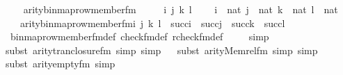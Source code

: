 \begin{isabellebody}
\ \ \isamarkupfalse%
%
\endisatagproof
{\isafoldproof}%
%
\isadelimproof
\isanewline
%
\endisadelimproof
\isanewline
{}\isamarkupfalse%
\ arity{\isacharunderscore}{\kern0pt}binmap{\isacharunderscore}{\kern0pt}row{\isacharprime}{\kern0pt}{\isacharunderscore}{\kern0pt}member{\isacharunderscore}{\kern0pt}fm\ {\isacharcolon}{\kern0pt}\ \isanewline
\ \ \ i\ j\ k\ l\ \isanewline
\ \ \ {\isachardoublequoteopen}i\ {\isasymin}\ nat{\isachardoublequoteclose}\ {\isachardoublequoteopen}j\ {\isasymin}\ nat{\isachardoublequoteclose}\ {\isachardoublequoteopen}k\ {\isasymin}\ nat{\isachardoublequoteclose}\ {\isachardoublequoteopen}l\ {\isasymin}\ nat{\isachardoublequoteclose}\ \isanewline
\ \ \ {\isachardoublequoteopen}arity{\isacharparenleft}{\kern0pt}binmap{\isacharunderscore}{\kern0pt}row{\isacharprime}{\kern0pt}{\isacharunderscore}{\kern0pt}member{\isacharunderscore}{\kern0pt}fm{\isacharparenleft}{\kern0pt}i{\isacharcomma}{\kern0pt}\ j{\isacharcomma}{\kern0pt}\ k{\isacharcomma}{\kern0pt}\ l{\isacharparenright}{\kern0pt}{\isacharparenright}{\kern0pt}\ {\isasymle}\ succ{\isacharparenleft}{\kern0pt}i{\isacharparenright}{\kern0pt}\ {\isasymunion}\ succ{\isacharparenleft}{\kern0pt}j{\isacharparenright}{\kern0pt}\ {\isasymunion}\ succ{\isacharparenleft}{\kern0pt}k{\isacharparenright}{\kern0pt}\ {\isasymunion}\ succ{\isacharparenleft}{\kern0pt}l{\isacharparenright}{\kern0pt}{\isachardoublequoteclose}\ \isanewline
%
\isadelimproof
\isanewline
\ \ %
\endisadelimproof
%
\isatagproof
{}\isamarkupfalse%
\ binmap{\isacharunderscore}{\kern0pt}row{\isacharprime}{\kern0pt}{\isacharunderscore}{\kern0pt}member{\isacharunderscore}{\kern0pt}fm{\isacharunderscore}{\kern0pt}def\ check{\isacharunderscore}{\kern0pt}fm{\isacharunderscore}{\kern0pt}def\ rcheck{\isacharunderscore}{\kern0pt}fm{\isacharunderscore}{\kern0pt}def\isanewline
\ \ \ \isamarkupfalse%
\ simp\isanewline
\ \ \ \isamarkupfalse%
{\isacharparenleft}{\kern0pt}subst\ arity{\isacharunderscore}{\kern0pt}tran{\isacharunderscore}{\kern0pt}closure{\isacharunderscore}{\kern0pt}fm{\isacharcomma}{\kern0pt}\ simp{\isacharcomma}{\kern0pt}\ simp{\isacharparenright}{\kern0pt}\isanewline
\ \ \isamarkupfalse%
{\isacharparenleft}{\kern0pt}subst\ arity{\isacharunderscore}{\kern0pt}Memrel{\isacharunderscore}{\kern0pt}fm{\isacharcomma}{\kern0pt}\ simp{\isacharcomma}{\kern0pt}\ simp{\isacharparenright}{\kern0pt}\isanewline
\ \ \ \isamarkupfalse%
{\isacharparenleft}{\kern0pt}subst\ arity{\isacharunderscore}{\kern0pt}empty{\isacharunderscore}{\kern0pt}fm{\isacharcomma}{\kern0pt}\ simp{\isacharparenright}{\kern0pt}\isanewline

\end{isabellebody}
